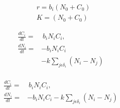 \documentclass{article}
\begin{document}
\begin{subequations}
	\label{eq:9}
	\begin{align}
	&r = b_{i}(N_0 + C_0)\\
	&K = (N_0 + C_0)
	\end{align}
\end{subequations}

\begin{subequations}
	\label{eq:5}
	\begin{align}
	\frac{dC_{i}}{dt} =&~b_{i}N_{i}C_{i},\\
	\frac{dN_{i}}{dt} =& - b_{i}N_{i}C_{i}\\
	 & - k\sum_{j \epsilon \delta_i}(N_{i} - N_{j})\\
	\end{align}
\end{subequations}

\begin{subequations}
	\label{eq:5}
	\begin{align}
	\frac{dC_{i}}{dt} =&~b_{i}N_{i}C_{i},\\
	\frac{dN_{i}}{dt} =& - b_{i}N_{i}C_{i} - k\sum_{j \epsilon \delta_i}(N_{i} - N_{j})\\
	\end{align}
\end{subequations}
\end{document}
